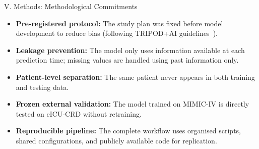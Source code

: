 \begin{frame}{V. Methods: Methodological Commitments}
\begin{itemize}
  \item \textbf{Pre-registered protocol:} The study plan was fixed before
        model development to reduce bias (following TRIPOD+AI
        guidelines~\cite{collins2024tripodai}).
  \item \textbf{Leakage prevention:} The model only uses information
        available at each prediction time; missing values are handled using
        past information only.
  \item \textbf{Patient-level separation:} The same patient never appears in
        both training and testing data.
  \item \textbf{Frozen external validation:} The model trained on MIMIC-IV
        is directly tested on eICU-CRD without retraining.
  \item \textbf{Reproducible pipeline:} The complete workflow uses organised
        scripts, shared configurations, and publicly available code for
        replication.
\end{itemize}
\end{frame}
